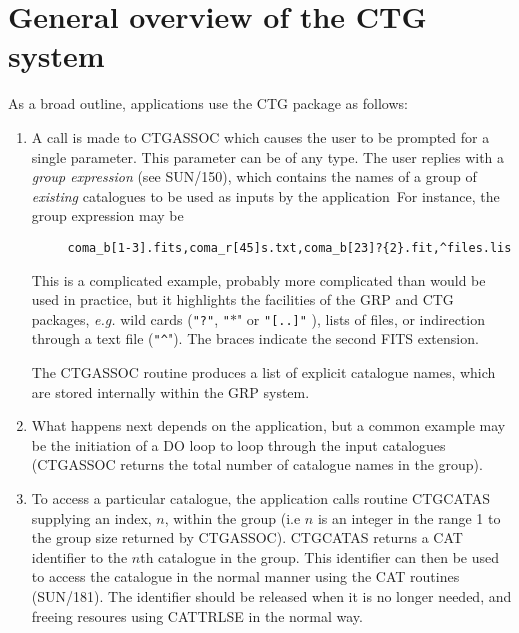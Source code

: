 \documentclass[twoside,11pt]{article}
\newcommand{\htmlref}[2]{#1}
\newcommand{\xref}[3]{#1}
\renewcommand{\_}{\texttt{\symbol{95}}}
\begin{document}
\section {General overview of the CTG\_ system}
As a broad outline, applications use the CTG\_ package as follows:

\begin{enumerate}

\item A call is made to \htmlref{CTG\_ASSOC}{CTG_ASSOC} which causes the user 
to be prompted for a single parameter. This parameter can be of any type.
The user replies with a \emph{group expression} (see
\xref{SUN/150}{sun150}{}), which contains the names of a group of {\em
existing} catalogues to be used as inputs by the application\
For instance, the group expression may be

\begin{verbatim}
     coma_b[1-3].fits,coma_r[45]s.txt,coma_b[23]?{2}.fit,^files.lis
\end{verbatim}

This is a complicated example, probably more complicated than would be
used in practice, but it highlights the facilities of the GRP and CTG
packages, \emph{e.g.} wild cards ({\tt "?"}, {\tt "$*$}" or {\tt "[..]"} ),
lists of files, or indirection through a text file ({\tt "\verb+^+}").
The braces indicate the second FITS extension.

The \htmlref{CTG\_ASSOC}{CTG_ASSOC} routine produces a list of
explicit catalogue names, which are stored internally within the GRP system.

\item What happens next depends on the application, but a common example may be
the initiation of a DO loop to loop through the input catalogues (CTG\_ASSOC returns
the total number of catalogue names in the group). 

\item To access a particular catalogue, the application calls routine 
\htmlref{CTG\_CATAS}{CTG_CATAS} supplying an index, $n$, within the
group (i.e $n$ is an integer in the range 1 to the group size returned
by CTG\_ASSOC). CTG\_CATAS returns a CAT identifier to the $n$th
catalogue in the group. This identifier can then be used to access the
catalogue in the normal manner using the CAT\_ routines
(\xref{SUN/181}{sun181}{}). The identifier should be released when it
is no longer needed, and freeing resoures using
\xref{CAT\_TRLSE}{sun181}{CAT_TRLSE} in the normal way.


\end{enumerate}
\end{document}
